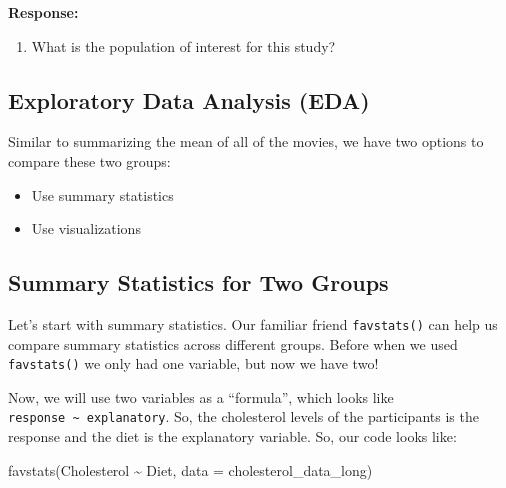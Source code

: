 \documentclass[
  letterpaper,
  DIV=11,
  numbers=noendperiod]{scrartcl}
\newenvironment{Shaded}{\begin{snugshade}}{\end{snugshade}}
\newcommand{\AttributeTok}[1]{\textcolor[rgb]{0.40,0.45,0.13}{#1}}
\newcommand{\FunctionTok}[1]{\textcolor[rgb]{0.28,0.35,0.67}{#1}}
\newcommand{\NormalTok}[1]{\textcolor[rgb]{0.00,0.23,0.31}{#1}}
\newcommand{\SpecialCharTok}[1]{\textcolor[rgb]{0.37,0.37,0.37}{#1}}
\providecommand{\tightlist}{%
  \setlength{\itemsep}{0pt}\setlength{\parskip}{0pt}}\usepackage{longtable,booktabs,array}
\begin{document}
\vspace{0.5in}

\textbf{Response:}

\vspace{0.5in}

\begin{enumerate}
\def\labelenumi{\arabic{enumi}.}
\setcounter{enumi}{2}
\tightlist
\item
  What is the population of interest for this study?
\end{enumerate}

\vspace{0.5in}

\hypertarget{exploratory-data-analysis-eda}{%
\subsection{Exploratory Data Analysis
(EDA)}\label{exploratory-data-analysis-eda}}

Similar to summarizing the mean of all of the movies, we have two
options to compare these two groups:

\begin{itemize}
\tightlist
\item
  Use summary statistics
\item
  Use visualizations
\end{itemize}

\hypertarget{summary-statistics-for-two-groups}{%
\subsection{Summary Statistics for Two
Groups}\label{summary-statistics-for-two-groups}}

Let's start with summary statistics. Our familiar friend
\texttt{favstats()} can help us compare summary statistics across
different groups. Before when we used \texttt{favstats()} we only had
one variable, but now we have two!

Now, we will use two variables as a ``formula'', which looks like
\texttt{response\ \textasciitilde{}\ explanatory}. So, the cholesterol
levels of the participants is the response and the diet is the
explanatory variable. So, our code looks like:

\begin{Shaded}
\begin{Highlighting}[]
\FunctionTok{favstats}\NormalTok{(Cholesterol }\SpecialCharTok{\textasciitilde{}}\NormalTok{ Diet, }
         \AttributeTok{data =}\NormalTok{ cholesterol\_data\_long)}
\end{Highlighting}
\end{Shaded}
\end{document}
